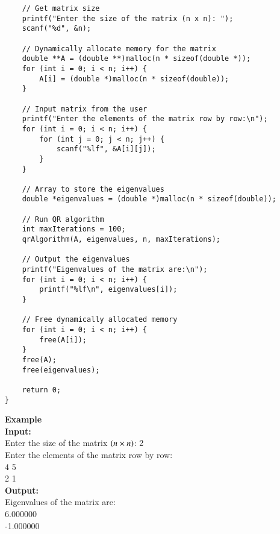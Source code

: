 \documentclass[journal]{IEEEtran}
\begin{document}
\begin{enumerate}
\begin{lstlisting}
    // Get matrix size
    printf("Enter the size of the matrix (n x n): ");
    scanf("%d", &n);

    // Dynamically allocate memory for the matrix
    double **A = (double **)malloc(n * sizeof(double *));
    for (int i = 0; i < n; i++) {
        A[i] = (double *)malloc(n * sizeof(double));
    }

    // Input matrix from the user
    printf("Enter the elements of the matrix row by row:\n");
    for (int i = 0; i < n; i++) {
        for (int j = 0; j < n; j++) {
            scanf("%lf", &A[i][j]);
        }
    }

    // Array to store the eigenvalues
    double *eigenvalues = (double *)malloc(n * sizeof(double));

    // Run QR algorithm
    int maxIterations = 100;
    qrAlgorithm(A, eigenvalues, n, maxIterations);

    // Output the eigenvalues
    printf("Eigenvalues of the matrix are:\n");
    for (int i = 0; i < n; i++) {
        printf("%lf\n", eigenvalues[i]);
    }

    // Free dynamically allocated memory
    for (int i = 0; i < n; i++) {
        free(A[i]);
    }
    free(A);
    free(eigenvalues);

    return 0;
}

\end{lstlisting}
\textbf{Example}\\
\textbf{Input:}\\
Enter the size of the matrix $\left(n \times n\right)$: 2\\
Enter the elements of the matrix row by row:\\
4 5\\
2 1\\
\textbf{Output:}\\
Eigenvalues of the matrix are:\\
6.000000\\
-1.000000











\end{enumerate}
\end{document}
